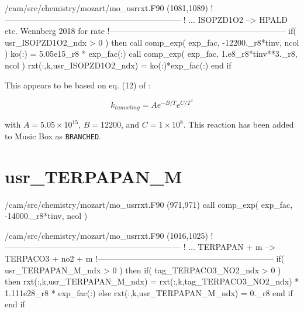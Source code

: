 \documentclass[titlepage]{article}
\begin{document}
\begin{blockcode}[commandchars=\\\{\}]
\color{gray}/cam/src/chemistry/mozart/mo_usrrxt.F90 (1081,1089)
!-----------------------------------------------------------------
!       ... ISOPZD1O2 --> HPALD etc. Wennberg 2018 for rate
!-----------------------------------------------------------------
       if( usr_ISOPZD1O2_ndx > 0 ) then
          call comp_exp( exp_fac, -12200._r8*tinv, ncol )
          ko(:) = 5.05e15_r8 * exp_fac(:)
          call comp_exp( exp_fac, 1.e8_r8*tinv**3._r8, ncol )
          rxt(:,k,usr_ISOPZD1O2_ndx) = ko(:)*exp_fac(:)
       end if
\end{blockcode}

This appears to be based on eq. (12) of \cite{Wennberg2018}:

\begin{equation}
k_{tunneling} = A e^{-B/T} e^{C/T^3}
\end{equation}

\noindent with $A = 5.05 \times 10^{15}$, $B = 12200$, and $C = 1 \times 10^8$. This reaction has been added to Music Box as \verb>BRANCHED>.


\section{usr\_TERPAPAN\_M}

\begin{blockcode}[commandchars=\\\{\}]
\color{gray}/cam/src/chemistry/mozart/mo_usrrxt.F90 (971,971)
       call comp_exp( exp_fac, -14000._r8*tinv, ncol )
\end{blockcode}

\begin{blockcode}[commandchars=\\\{\}]
\color{gray}/cam/src/chemistry/mozart/mo_usrrxt.F90 (1016,1025)
!-----------------------------------------------------------------
!       ... TERPAPAN + m --> TERPACO3 + no2 + m
!-----------------------------------------------------------------
       if( usr_TERPAPAN_M_ndx > 0 ) then
          if( tag_TERPACO3_NO2_ndx > 0 ) then
             rxt(:,k,usr_TERPAPAN_M_ndx) = rxt(:,k,tag_TERPACO3_NO2_ndx) * 1.111e28_r8 * exp_fac(:)
          else
             rxt(:,k,usr_TERPAPAN_M_ndx) = 0._r8
          end if
       end if
\end{blockcode}
\end{document}
